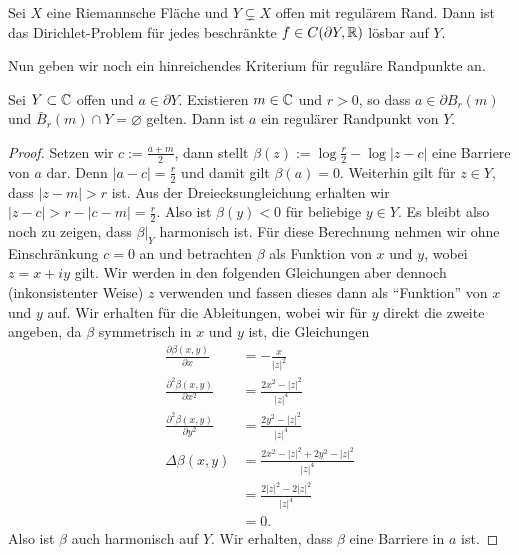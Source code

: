 \begin{thm}
  \label{thm:dirichlet}
  Sei $X$ eine Riemannsche Fläche und  $Y \subsetneq X$ offen mit
  regulärem Rand. Dann ist das Dirichlet-Problem für jedes
  beschränkte $f \in C(\partial Y, \mathbb{R})$ lösbar auf $Y$.
\end{thm}

Nun geben wir noch ein hinreichendes Kriterium für reguläre Randpunkte an.

\begin{thm}
  \label{thm:reg-rand}
  Sei $Y \subset \mathbb{C}$ offen und $a \in \partial Y$. Existieren $m \in \mathbb{C}$
  und $r > 0$, so dass $a \in \partial B_r(m)$ und $\bar
  B_r(m) \cap Y = \varnothing$ gelten. Dann ist $a$ ein regulärer Randpunkt von $Y$.
\end{thm}

\begin{proof}
  Setzen wir $c := \frac{a+m}{2}$, dann stellt $\beta(z) := \log
  \frac{r}{2} - \log|z-c|$ eine Barriere von $a$ dar. Denn $|a - c| =
  \frac{r}{2}$ und damit gilt $\beta(a) = 0$. Weiterhin gilt für $z
  \in Y$, dass $|z-m| > r$ ist. Aus der Dreiecksungleichung erhalten
  wir $|z-c| > r - |c-m| = \frac{r}{2}$. Also ist $\beta(y) < 0$ für
  beliebige $y \in Y$. Es bleibt also noch zu zeigen, dass $\beta|_Y$
  harmonisch ist. Für diese Berechnung nehmen wir ohne Einschränkung
  $c = 0$ an und betrachten $\beta$ als Funktion von $x$ und $y$,
  wobei $z = x + iy$ gilt. Wir werden in den folgenden Gleichungen
  aber dennoch (inkonsistenter Weise) $z$ verwenden und fassen dieses
  dann als "`Funktion"' von $x$ und $y$ auf. Wir erhalten für die
  Ableitungen, wobei wir für $y$ direkt die zweite angeben, da $\beta$
  symmetrisch in $x$ und $y$ ist, die Gleichungen 
  \begin{align*}
    \frac{\partial \beta(x,y)}{\partial x} & = - \frac{x}{|z|^2} \\
    \frac{\partial^2 \beta(x,y)}{\partial x^2} & = \frac{2x^2 -
      |z|^2}{|z|^4} \\
    \frac{\partial^2 \beta(x,y)}{\partial y^2} & = \frac{2y^2 -
      |z|^2}{|z|^4} \\
    \Delta \beta(x,y) & = \frac{2 x^2 - |z|^2 + 2y^2 -|z|^2}{|z|^4} \\
    & = \frac{2 |z|^2 - 2|z|^2}{|z|^4} \\
    & = 0.
  \end{align*}
  Also ist $\beta$ auch harmonisch auf $Y$. Wir erhalten, dass $\beta$
  eine Barriere in $a$ ist.
\end{proof}

